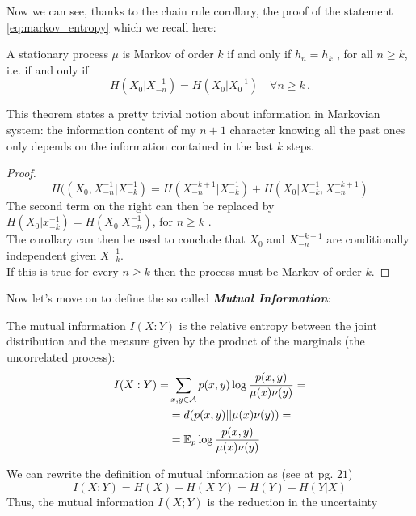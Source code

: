 Now we can see, thanks to the chain rule corollary, the proof of the statement \ref{eq:markov_entropy} which we recall here:
\begin{theorem}
    A stationary process $\mu$ is Markov of order $k$ if and only if $h_n = h_k$ , for all $n \geq k$, i.e. if and only if 
    \begin{equation}
        H(X_0 | X_{-n}^{-1}) = H(X_0 | X_{0}^{-1}) \quad \forall n \geq k \, .
    \end{equation}
\end{theorem}
This theorem states a pretty trivial notion about information in Markovian system: the information content of my $n+1$ character knowing all the past ones only depends on the information contained in the last $k$ steps.
\begin{proof} 
    \begin{equation*}
        H( (X_0, X_{-n}^{-1} | X_{-k}^{-1} ) = H( X_{-n}^{-k+1} | X_{-k}^{-1} ) + H( X_0 | X_{-k}^{-1}, X_{-n}^{-k+1} )
    \end{equation*}
    The second term on the right can then be replaced by $H(X_0 | x_{-k}^{-1}) = H(X_0 | X_{-n}^{-1})$, for $n \geq k$ .
    \\The corollary can then be used to conclude that $X_0$ and $X_{-n}^{-k+1}$ are conditionally independent given $X_{-k}^{-1}$. 
    \\If this is true for every $n \geq k$ then the process must be Markov of order $k$.
\end{proof}
Now let's move on to define the so called \textbf{\textit{Mutual Information}}:
\begin{definition}
    The mutual information $I(X : Y)$ is the relative entropy between the joint distribution and the measure given by the product of the marginals (the uncorrelated process):
    \begin{align}
        I(X : Y) = &  \sum_{x,y \in \mathcal{A}} p(x,y) \log \frac{p(x,y)}{\mu(x) \nu(y)} = \\ &= d( p(x,y) || \mu(x) \nu(y)) = \\ &= \mathbb{E}_p \log \frac{p(x,y)}{\mu(x) \nu(y)} 
    \end{align}
\end{definition}
We can rewrite the definition of mutual information as (see \cite{Cover_and_Thomas} at pg. $21$) 
\begin{equation}
    I(X:Y) = H(X) - H(X|Y) = H(Y) - H(Y|X)
\end{equation}
Thus, the mutual information $I (X; Y )$ is the reduction in the uncertainty
